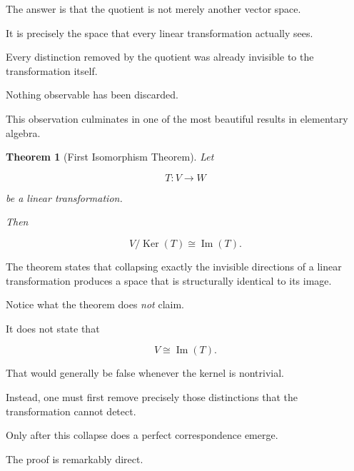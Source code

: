 \documentclass[11pt]{book}
\numberwithin{equation}{chapter}
\theoremstyle{definition}
\theoremstyle{plain}
\newtheorem{theorem}[definition]{Theorem}
\theoremstyle{remark}
\DeclareMathOperator{\Ker}{Ker}
\DeclareMathOperator{\Image}{Im}
\begin{document}
The answer is that the quotient is not merely another vector space.

It is precisely the space that every linear transformation actually sees.

Every distinction removed by the quotient was already invisible to the transformation itself.

Nothing observable has been discarded.

This observation culminates in one of the most beautiful results in elementary algebra.

\begin{theorem}[First Isomorphism Theorem]
Let

\[
T:V\rightarrow W
\]

be a linear transformation.

Then

\[
V/\Ker(T)
\cong
\Image(T).
\]

\end{theorem}

The theorem states that collapsing exactly the invisible directions of a linear transformation produces a space that is structurally identical to its image.

Notice what the theorem does \emph{not} claim.

It does not state that

\[
V\cong\Image(T).
\]

That would generally be false whenever the kernel is nontrivial.

Instead, one must first remove precisely those distinctions that the transformation cannot detect.

Only after this collapse does a perfect correspondence emerge.

The proof is remarkably direct.
\end{document}
